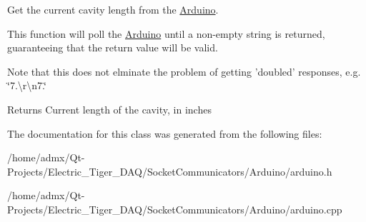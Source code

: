 Get the current cavity length from the \hyperlink{class_arduino}{Arduino}. 

This function will poll the \hyperlink{class_arduino}{Arduino} until a non-\/empty string is returned, guaranteeing that the return value will be valid.

Note that this does not elminate the problem of getting 'doubled' responses, e.\+g. \char`\"{}7.\textbackslash{}r\textbackslash{}n7.\char`\"{}

\begin{DoxyReturn}{Returns}
Current length of the cavity, in inches 
\end{DoxyReturn}


The documentation for this class was generated from the following files\+:\begin{DoxyCompactItemize}
\item 
/home/admx/\+Qt-\/\+Projects/\+Electric\+\_\+\+Tiger\+\_\+\+D\+A\+Q/\+Socket\+Communicators/\+Arduino/arduino.\+h\item 
/home/admx/\+Qt-\/\+Projects/\+Electric\+\_\+\+Tiger\+\_\+\+D\+A\+Q/\+Socket\+Communicators/\+Arduino/arduino.\+cpp\end{DoxyCompactItemize}
